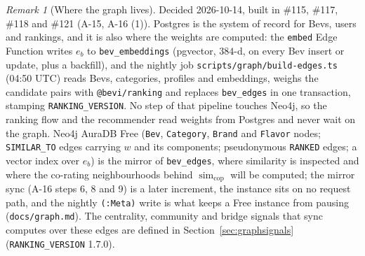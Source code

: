 \documentclass[11pt]{article}
\DeclareMathOperator{\simi}{sim}
\newcommand{\code}[1]{\texttt{#1}}
\theoremstyle{plain}
\theoremstyle{definition}
\theoremstyle{remark}
\newtheorem{remark}[theorem]{Remark}
\begin{document}
\begin{remark}[Where the graph lives]
Decided 2026-10-14, built in \#115, \#117, \#118 and \#121 (A-15, A-16 (1)). Postgres is the system of record for Bevs, users and rankings, and it is also where the weights are computed: the \code{embed} Edge Function writes $e_b$ to \code{bev\_embeddings} (pgvector, $384$-d, on every Bev insert or update, plus a backfill), and the nightly job \code{scripts/graph/build-edges.ts} (04:50 UTC) reads Bevs, categories, profiles and embeddings, weighs the candidate pairs with \code{@bevi/ranking} and replaces \code{bev\_edges} in one transaction, stamping \code{RANKING\_VERSION}. No step of that pipeline touches Neo4j, so the ranking flow and the recommender read weights from Postgres and never wait on the graph. Neo4j AuraDB Free (\code{Bev}, \code{Category}, \code{Brand} and \code{Flavor} nodes; \code{SIMILAR\_TO} edges carrying $w$ and its components; pseudonymous \code{RANKED} edges; a vector index over $e_b$) is the mirror of \code{bev\_edges}, where similarity is inspected and where the co-rating neighbourhoods behind $\simi_{\mathrm{cop}}$ will be computed; the mirror sync (A-16 steps 6, 8 and 9) is a later increment, the instance sits on no request path, and the nightly \code{(:Meta)} write is what keeps a Free instance from pausing (\code{docs/graph.md}). The centrality, community and bridge signals that sync computes over these edges are defined in Section~\ref{sec:graphsignals} (\code{RANKING\_VERSION} 1.7.0).
\end{remark}
\end{document}
